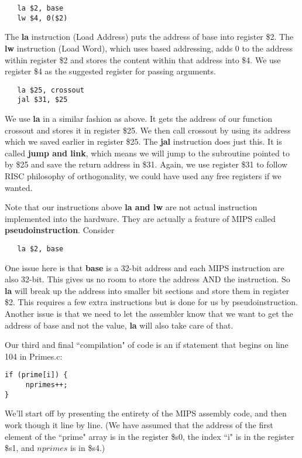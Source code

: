 \documentclass[11pt]{article}
\begin{document}
\begin{verbatim}
   la $2, base
   lw $4, 0($2)
\end{verbatim}

The {\bf la} instruction (Load Address) puts the address of base into register \$2. The {\bf lw} instruction (Load Word), which uses based addressing, adds 0 to the address within register \$2 and stores the content within that address into \$4. We use register \$4 as the suggested register for passing arguments.

\begin{verbatim}
   la $25, crossout
   jal $31, $25
\end{verbatim}

We use {\bf la} in a similar fashion as above. It gets the address of our function crossout and stores it in register \$25. We then call crossout by using its address which we saved earlier in register \$25. The {\bf jal} instruction does just this. It is called {\bf jump and link}, which means we will jump to the subroutine pointed to by \$25 and save the return address in \$31. Again, we use register \$31 to follow RISC philosophy of orthogonality, we could have used any free registers if we wanted.

Note that our instructions above {\bf la and lw} are not actual instruction implemented into the hardware. They are actually a feature of MIPS called {\bf pseudoinstruction}. Consider 

\begin{verbatim}
   la $2, base
\end{verbatim}

One issue here is that {\bf base} is a 32-bit address and each MIPS instruction are also 32-bit. This gives us no room to store the address AND the instruction. So {\bf la} will break up the address into smaller bit sections and store them in register \$2. This requires a few extra instructions but is done for us by pseudoinstruction. Another issue is that we need to let the assembler know that we want to get the address of base and not the value, {\bf la} will also take care of that.



Our third and final ``compilation" of code is an if statement that begins on line 104 in Primes.c:

\begin{verbatim}
if (prime[i]) {
     nprimes++;
}
\end{verbatim}

We'll start off by presenting the entirety of the MIPS assembly code, and then work though it line by line. (We have assumed that the address of the first element of the ``prime" array is in the register \$s0, the index ``i" is in the register \$s1, and $nprimes$ is in \$s4.)
\end{document}
